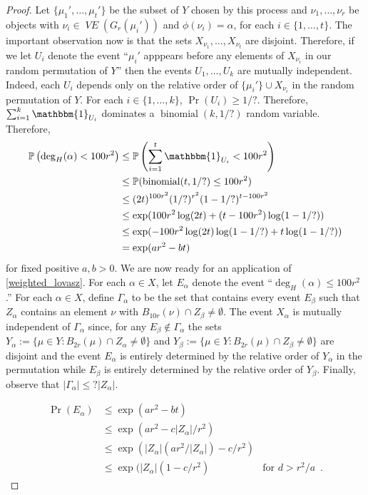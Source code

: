 \documentclass{patmorin}
\DeclareMathOperator{\binomial}{binomial}
\DeclareMathOperator{\VE}{\mathit{VE}}
\begin{document}
\begin{proof}
  Let $\{\mu_1',\ldots,\mu_t'\}$ be the subset of $Y$ chosen by this process and $\nu_1,\ldots,\nu_r$ be objects with $\nu_i\in\VE(G_r(\mu_i'))$ and $\phi(\nu_i)=\alpha$, for each $i\in\{1,\ldots,t\}$.  The important observation now is that the sets $X_{\nu_1},\ldots,X_{\nu_t}$ are disjoint.  Therefore, if we let $U_i$ denote the event ``$\mu_i'$ apppears before any elements of $X_{\nu_i}$ in our random permutation of $Y$'' then the events $U_1,\ldots,U_k$ are mutually independent.  Indeed, each $U_i$ depends only on the relative order of $\{\mu_i'\}\cup X_{\nu_i}$ in the random permutation of $Y$.  For each $i\in\{1,\ldots,k\}$, $\Pr(U_i)\ge 1/?$.  Therefore, $\sum_{i=1}^k \mathbbm{1}_{U_i}$ dominates a $\binomial(k,1/?)$ random variable.  Therefore,
  \begin{align*}
    \Pr\left(\deg_H(\alpha)< 100r^2\right)
    & \le \Pr\left(\sum_{i=1}^t \mathbbm{1}_{U_i} < 100r^2\right) \\
    & \le \Pr(\binomial(t,1/?)\le 100r^2) \\
    & \le (2t)^{100r^2}(1/?)^{r^2}(1-1/?)^{t-100r^2} \\
    & \le \exp(100r^2\log(2t)+(t-100r^2)\log(1-1/?)) \\
    & \le \exp(-100r^2\log(2t)\log(1-1/?) + t\log(1-1/?)) \\
    & = \exp(ar^2 - bt)
  \end{align*}
  for fixed positive $a,b>0$.
  We are now ready for an application of \cref{weighted_lovasz}.  For each $\alpha\in X$, let $E_\alpha$ denote the event ``$\deg_H(\alpha)\le 100r^2$.''  For each $\alpha\in X$, define $\Gamma_\alpha$ to be the set that contains every event $E_\beta$ such that $Z_\alpha$ contains an element $\nu$ with $B_{10r}(\nu)\cap Z_\beta\neq\emptyset$.  The event $X_\alpha$ is mutually independent of $\Gamma_\alpha$ since, for any $E_\beta\not\in \Gamma_\alpha$ the sets $Y_\alpha:=\{\mu\in Y:B_{2r}(\mu)\cap Z_\alpha\neq\emptyset\}$ and $Y_\beta:=\{\mu\in Y:B_{2r}(\mu)\cap Z_\beta\neq\emptyset\}$ are disjoint and the event $E_\alpha$ is entirely determined by the relative order of $Y_\alpha$ in the permutation while $E_\beta$ is entirely determined by the relative order of $Y_\beta$.   Finally, observe that $|\Gamma_\alpha|\le ?|Z_\alpha|$.

  \begin{align*}
      \Pr(E_\alpha)
      & \le \exp(ar^2-bt) \\
      & \le \exp(ar^2-c|Z_\alpha|/r^2) \\
      & \le \exp(|Z_\alpha|(ar^2/|Z_\alpha|)-c/r^2) \\
      & \le \exp(|Z_\alpha|(1-c/r^2) & \text{for $d>r^2/a$} \enspace .
  \end{align*}


\end{proof}
\end{document}
